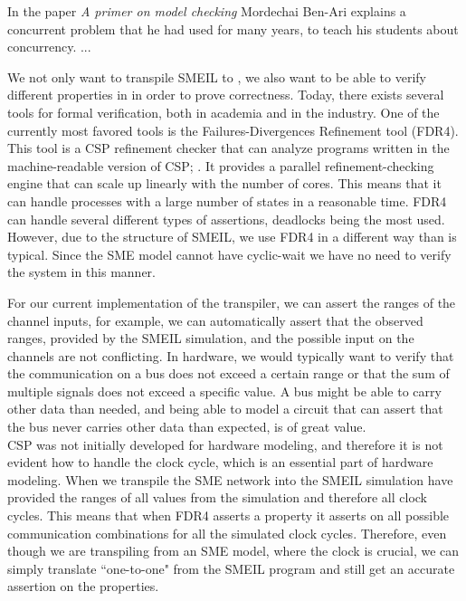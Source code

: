 In the paper \textit{A primer on model checking}\cite{Ben-ari2010} Mordechai Ben-Ari explains a concurrent problem that he had used for many years, to teach his students about concurrency. ... %


We not only want to transpile SMEIL to \cspm{}, we also want to be able to verify different properties in \cspm{} in order to prove correctness. Today, there exists several tools for formal verification, both in academia and in the industry. One of the currently most favored tools is the Failures-Divergences Refinement tool (FDR4). This tool is a CSP refinement checker that can analyze programs written in the machine-readable version of CSP; \cspm{}.
It provides a parallel refinement-checking engine that can scale up linearly with the number of cores. This means that it can handle processes with a large number of states in a reasonable time. FDR4 can handle several different types of assertions, deadlocks being the most used. However, due to the structure of SMEIL, we use FDR4 in a different way than is typical. Since the SME model cannot have cyclic-wait we have no need to verify the system in this manner.

For our current implementation of the transpiler, we can assert the ranges of the channel inputs, for example, we can automatically assert that the observed ranges, provided by the SMEIL simulation, and the possible input on the \cspm{} channels are not conflicting.
In hardware, we would typically want to verify that the communication on a bus does not exceed a certain range or that the sum of multiple signals does not exceed a specific value. A bus might be able to carry other data than needed, and being able to model a circuit that can assert that the bus never carries other data than expected, is of great value.
\\

CSP was not initially developed for hardware modeling, and therefore it is not evident how to handle the clock cycle, which is an essential part of hardware modeling. When we transpile the SME network into \cspm{} the SMEIL simulation have provided the ranges of all values from the simulation and therefore all clock cycles. This means that when FDR4 asserts a property it asserts on all possible communication combinations for all the simulated clock cycles. Therefore, even though we are transpiling from an SME model, where the clock is crucial, we can simply translate ``one-to-one" from the SMEIL program and still get an accurate assertion on the properties.

